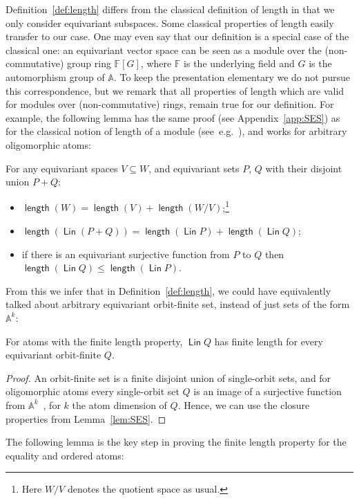 \documentclass{theoretics}
\newcommand{\atoms}{\mathbb A}
\DeclareMathOperator{\lin}{\mathsf{Lin}}
\DeclareMathOperator{\length}{\mathsf{length}}
\newcommand{\field}{\mathbb F}
\begin{document}
Definition~\ref{def:length} differs from the classical definition of length in that we only consider equivariant subspaces. Some classical properties of length  easily transfer to our case. One may even say that our definition is a special case of the classical one: an equivariant vector space can be seen as a module over the (non-commutative) group ring $\field[G]$, where $\field$ is the underlying field and $G$ is the automorphism group of $\atoms$. To keep the presentation elementary we do not pursue this correspondence, but we remark that all properties of length which are valid for modules over (non-commutative) rings, remain true for our definition.
For example, the following lemma has the same proof (see Appendix~\ref{app:SES}) 
as for the classical notion of length of a module (see~e.g.~\cite[Prop.~4.12]{goodearl_warfield}), and works for arbitrary oligomorphic atoms:
\begin{lemma}\label{lem:SES}
For any equivariant spaces $V\subseteq W$, and equivariant sets $P$, $Q$ with their disjoint union $P+Q$: \begin{itemize}
\item[(i)]	$\length(W)=\length(V)+\length(W/V)$;\footnote{Here $W/V$ denotes the quotient space as usual.}
\item[(ii)]	$\length(\lin(P+Q)) = \length(\lin P) + \length(\lin Q)$;
\item[(iii)] if there is an equivariant surjective function from $P$ to $Q$ then $\length(\lin Q)\leq\length(\lin P)$.
\end{itemize}
\end{lemma} 

From this we infer that in Definition~\ref{def:length}, we could have equivalently talked about arbitrary equivariant orbit-finite set, instead of just sets of the form $\atoms^k$:
\begin{corollary} For  atoms with the finite length property,  $\lin Q$ has finite length for every equivariant orbit-finite  $Q$.
\end{corollary}
\begin{proof}
	An orbit-finite set is a finite disjoint union of single-orbit sets, and for oligomorphic atoms every single-orbit set $Q$ is an image of a surjective function from $\atoms^k$~\cite{BKL14}, for $k$ the atom dimension of $Q$.
	Hence, we can use the closure properties from Lemma~\ref{lem:SES}.
\end{proof}

The following lemma is the key step in proving the finite length property for the equality and ordered atoms:
\end{document}
